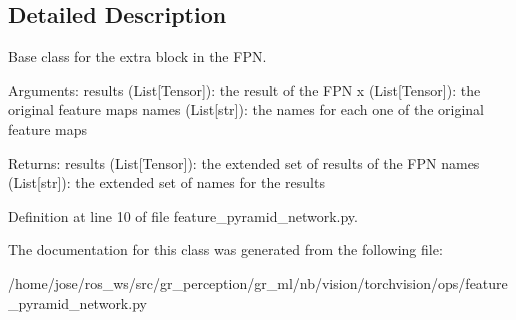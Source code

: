 \subsection{Detailed Description}
\begin{DoxyVerb}Base class for the extra block in the FPN.

Arguments:
    results (List[Tensor]): the result of the FPN
    x (List[Tensor]): the original feature maps
    names (List[str]): the names for each one of the
        original feature maps

Returns:
    results (List[Tensor]): the extended set of results
        of the FPN
    names (List[str]): the extended set of names for the results
\end{DoxyVerb}
 

Definition at line 10 of file feature\+\_\+pyramid\+\_\+network.\+py.



The documentation for this class was generated from the following file\+:\begin{DoxyCompactItemize}
\item 
/home/jose/ros\+\_\+ws/src/gr\+\_\+perception/gr\+\_\+ml/nb/vision/torchvision/ops/feature\+\_\+pyramid\+\_\+network.\+py\end{DoxyCompactItemize}
